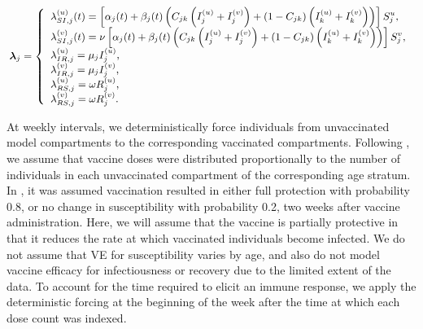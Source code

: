 \begin{equation}\small
\label{eqn:flu_sirs_rates}
\boldsymbol{\lambda}_{j} = \left\lbrace
\begin{array}{ll}
\lambda_{SI,j}^{(u)}(t) = \left [\alpha_{j}(t) + \beta_{j}(t)\left (C_{jk}\left (I_{j}^{(u)} + I_{j}^{(v)}\right ) + (1-C_{jk})\left (I_{k}^{(u)} + I_{k}^{(v)}\right )\right )\right ]S_{j}^{u}, \\ 
\lambda_{SI,j}^{(v)}(t) = \nu\left [\alpha_{j}(t) + \beta_{j}(t)\left (C_{jk}\left (I_{j}^{(u)} + I_{j}^{(v)}\right ) + (1-C_{jk})\left (I_{k}^{(u)} + I_{k}^{(v)}\right )\right )\right ]S_{j}^{v},\\
\lambda_{IR,j}^{(u)} = \mu_{j} I_{j}^{(u)}, \\
\lambda_{IR,j}^{(v)} = \mu_{j} I_{j}^{(v)}, \\
\lambda_{RS,j}^{(u)} = \omega R_{j}^{(u)}, \\
\lambda_{RS,j}^{(v)} = \omega R_{j}^{(v)}.
\end{array}
\right .
\end{equation}

At weekly intervals, we deterministically force individuals from unvaccinated model compartments to the corresponding vaccinated compartments. Following \cite{shubin2016revealing}, we assume that vaccine doses were distributed proportionally to the number of individuals in each unvaccinated compartment of the corresponding age stratum. In \cite{shubin2016revealing}, it was assumed vaccination resulted in either full protection with probability 0.8, or no change in susceptibility with probability 0.2, two weeks after vaccine administration. Here, we will assume that the vaccine is partially protective in that it reduces the rate at which vaccinated individuals become infected. We do not assume that VE for susceptibility varies by age, and also do not model vaccine efficacy for infectiousness or recovery due to the limited extent of the data. To account for the time required to elicit an immune response, we apply the deterministic forcing at the beginning of the week after the time at which each dose count was indexed.

